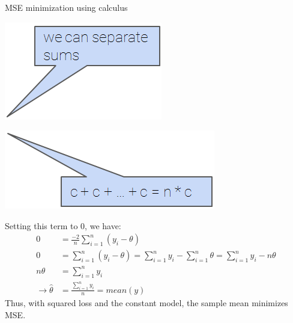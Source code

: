 \documentclass[aspectratio=169]{../latex_main/tntbeamer}  %
\begin{document}
	
	
	\begin{frame}{MSE minimization using calculus}
	    
	    \vspace{0.5cm}
	    \hspace{8cm} \includegraphics[scale=.4]{Bild29}\\
	    \vspace{-0.5cm}
	    
	    
	    \vspace{1cm}
	    \hspace{11cm} \includegraphics[scale=.4]{Bild30}\\
	    \vspace{-1cm}
	    
	    \vspace{-3.5cm}
	    Setting this term to 0, we have:
        \begin{align*}
            0 &= \frac{-2}{n}\sum\limits_{i=1}^n(y_i - \theta)\\
            0 &= \sum\limits_{i=1}^n(y_i - \theta) = \sum\limits_{i=1}^ny_i - \sum\limits_{i=1}^n\theta = \sum\limits_{i=1}^ny_i - n\theta\\
            n\theta &= \sum\limits_{i=1}^ny_i\\
            \rightarrow \hat{\theta} &= \frac{\sum_{i=1}^ny_i}{n} = mean(y)
        \end{align*}
        Thus, with squared loss and the constant model, the sample mean minimizes MSE.
	\end{frame}
	
\end{document}
